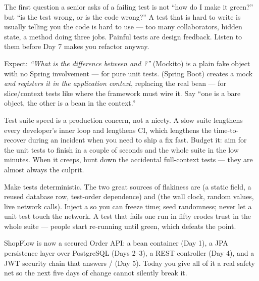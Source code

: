 \begin{seniornote}
The first question a senior asks of a failing test is not ``how do I make it green?'' but ``is the test wrong, or is the code wrong?'' A test that is hard to write is usually telling you the code is hard to use --- too many collaborators, hidden state, a method doing three jobs. Painful tests are design feedback. Listen to them before Day 7 makes you refactor anyway.
\end{seniornote}

\begin{interview}
Expect: \emph{``What is the difference between  and ?''}  (Mockito) is a plain fake object with no Spring involvement --- for pure unit tests.  (Spring Boot) creates a mock \emph{and registers it in the application context}, replacing the real bean --- for slice/context tests like  where the framework must wire it. Say ``one is a bare object, the other is a bean in the context.''
\end{interview}

\begin{perfnote}
Test suite speed is a production concern, not a nicety. A slow suite lengthens every developer's inner loop and lengthens CI, which lengthens the time-to-recover during an incident when you need to ship a fix fast. Budget it: aim for the unit tests to finish in a couple of seconds and the whole suite in the low minutes. When it creeps, hunt down the accidental full-context tests --- they are almost always the culprit.
\end{perfnote}

\begin{prodtip}
Make tests deterministic. The two great sources of flakiness are  (a static field, a reused database row, test-order dependence) and  (the wall clock, random values, live network calls). Inject a  so you can freeze time; seed randomness; never let a unit test touch the network. A test that fails one run in fifty erodes trust in the whole suite --- people start re-running until green, which defeats the point.
\end{prodtip}


ShopFlow is now a secured Order API: a bean container (Day 1), a JPA persistence layer over PostgreSQL (Days 2--3), a REST controller (Day 4), and a JWT security chain that answers / (Day 5). Today you give all of it a real safety net so the next five days of change cannot silently break it.

